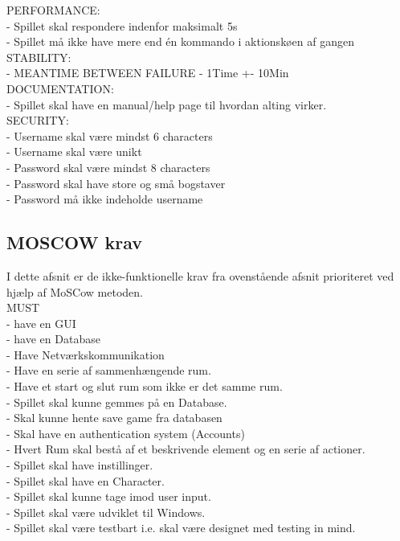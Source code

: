 PERFORMANCE:\\
    - Spillet skal respondere indenfor maksimalt 5s\\
    - Spillet må ikke have mere end én kommando i aktionskøen af gangen\\
  STABILITY:\\
    - MEANTIME BETWEEN FAILURE - 1Time +- 10Min\\
  DOCUMENTATION:\\
    - Spillet skal have en manual/help page til hvordan alting virker.\\
  SECURITY:\\
    - Username skal være mindst 6 characters\\
    - Username skal være unikt\\
    - Password skal være mindst 8 characters\\
    - Password skal have store og små bogstaver\\
    - Password må ikke indeholde username\\

\subsection{MOSCOW krav}
\label{ssec:MOSCOW}
I dette afsnit er de ikke-funktionelle krav fra ovenstående afsnit prioriteret ved hjælp af MoSCow metoden.\\
MUST\\
  - have en GUI\\
  - have en Database\\
  - Have Netværkskommunikation\\
  - Have en serie af sammenhængende rum.\\
  - Have et start og slut rum som ikke er det samme rum.\\
  - Spillet skal kunne gemmes på en Database.\\
  - Skal kunne hente save game fra databasen\\
  - Skal have en authentication system (Accounts)\\
  - Hvert Rum skal bestå af et beskrivende element og en serie af actioner.\\
  - Spillet skal have instillinger.\\
  - Spillet skal have en Character.\\
  - Spillet skal kunne tage imod user input.\\
  - Spillet skal være udviklet til Windows.\\
  - Spillet skal være testbart i.e. skal være designet med testing in mind.\\

